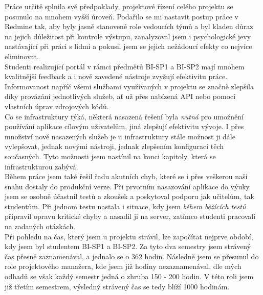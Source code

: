 Práce určitě splnila své předpoklady, projektové řízení celého projektu se posunulo na mnohem vyšší úroveň. Podařilo se mi nastavit postup práce v Redmine tak, aby byly jasně stanovené role vedoucích týmů a byl kladen důraz na jejich důležitost při kontrole výstupu, zanalyzoval jsem i psychologické jevy nastávající při práci s lidmi a pokusil jsem se jejich nežádoucí efekty co nejvíce eliminovat.\\
Studenti realizující portál v rámci předmětů BI-SP1 a BI-SP2 mají mnohem kvalitnější feedback a i nově zavedené nástroje zvyšují efektivitu práce. Informovanost napříč všemi službami využívaných v projektu se značně zlepšila díky provázání jednotlivých služeb, ať už přes nabízená API nebo pomocí vlastních úprav zdrojových kódů.\\
Co se infrastruktury týká, některá nasazená řešení byla \emph{nutná} pro umožnění používání aplikace cílovým uživatelům, jiná zlepšují efektivitu vývoje. I přes množství nově nasazených služeb je u infrastruktury stále možnost ji dále vylepšovat, jednak novými nástroji, jednak zlepšením konfigurací těch současných. Tyto možnosti jsem nastínil na konci kapitoly, která se infrastrukturou zabývá.\\
Během práce jsem také řešil řadu akutních chyb, které se i přes veškerou naši snahu dostaly do produkční verze. Při prvotním nasazování aplikace do výuky jsem se osobně účastnil testů a zkoušek a poskytoval podporu jak učitelům, tak studentům. Při jednom testu nastala i situace, kdy jsem \emph{během běžících testů} připravil opravu kritické chyby a nasadil ji na server, zatímco studenti pracovali na zadaných otázkách.\\
Při pohledu na čas, který jsem u projektu strávil, lze započítat nejprve období, kdy jsem byl studentem BI-SP1 a BI-SP2. Za tyto dva semestry jsem strávený čas přesně zaznamenával, a jednalo se o 362 hodin. Následně jsem se přesunul do role projektového manažera, kde jsem již hodiny nezaznamenával, dle mých odhadů se však každý semestr jedná o zhruba 150 - 200 hodin. V této roli jsem již třetím semestrem, výsledný strávený čas se tedy blíží 1000 hodinám.

